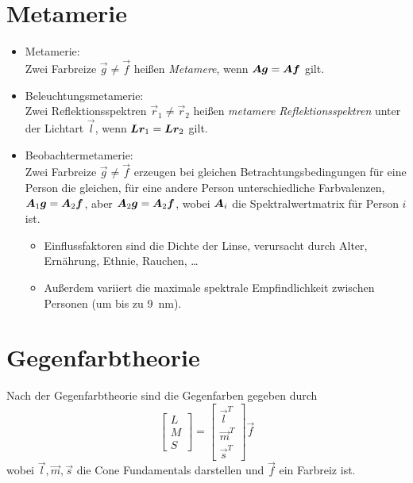 		\section{Metamerie}
			\begin{itemize}
				\item Metamerie: \\ Zwei Farbreize \( \vec{g} \neq \vec{f} \) heißen \emph{Metamere}, wenn \( \bm{A} \bm{g} = \bm{A} \bm{f} \) gilt.
				\item Beleuchtungsmetamerie: \\ Zwei Reflektionsspektren \( \vec{r}_1 \neq \vec{r}_2 \) heißen \emph{metamere Reflektionsspektren} unter der Lichtart \( \vec{l} \), wenn \( \bm{L} \bm{r}_1 = \bm{L} \bm{r}_2 \) gilt.
				\item Beobachtermetamerie: \\ Zwei Farbreize \( \vec{g} \neq \vec{f} \) erzeugen bei gleichen Betrachtungsbedingungen für eine Person die gleichen, für eine andere Person unterschiedliche Farbvalenzen, \dh \( \bm{A}_1 \bm{g} = \bm{A}_2 \bm{f} \), aber \( \bm{A}_2 \bm{g} = \bm{A}_2 \bm{f} \), wobei \( \bm{A}_i \) die Spektralwertmatrix für Person \(i\) ist.
					\begin{itemize}
						\item Einflussfaktoren sind \zB die Dichte der Linse, verursacht durch Alter, Ernährung, Ethnie, Rauchen, \dots
						\item Außerdem variiert die maximale spektrale Empfindlichkeit zwischen Personen (um bis zu \SI{9}{\nano\meter}).
					\end{itemize}
			\end{itemize}

		\section{Gegenfarbtheorie}
			Nach der Gegenfarbtheorie sind die Gegenfarben gegeben durch
			\begin{equation*}
				\begin{bmatrix}
					L \\
					M \\
					S
				\end{bmatrix}
				=
				\begin{bmatrix}
					\vec{l}^T \\
					\vec{m}^T \\
					\vec{s}^T
				\end{bmatrix}
				\vec{f}
			\end{equation*}
			wobei \( \vec{l}, \vec{m}, \vec{s} \) die Cone Fundamentals darstellen und \(\vec{f}\) ein Farbreiz ist.

